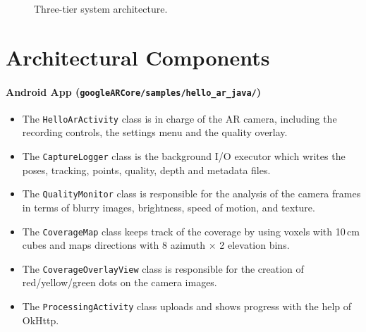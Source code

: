 \begin{figure}[htbp]
\caption{Three-tier system architecture.}
\label{fig:architecture}
\end{figure}

\section{Architectural Components}
\label{sec:components}

\paragraph{Android App (\texttt{googleARCore/samples/hello\_ar\_java/})}
\begin{itemize}
    \item The \texttt{HelloArActivity} class is in charge of the AR camera, including the recording controls, the settings menu and the quality overlay.
    \item The \texttt{CaptureLogger} class is the background I/O executor which writes the poses, tracking, points, quality, depth and metadata files.
    \item The \texttt{QualityMonitor} class is responsible for the analysis of the camera frames in terms of blurry images, brightness, speed of motion, and texture.
    \item The \texttt{CoverageMap} class keeps track of the coverage by using voxels with 10\,cm cubes and maps directions with 8 azimuth $\times$ 2 elevation bins.
    \item The \texttt{CoverageOverlayView} class is responsible for the creation of red/yellow/green dots on the camera images.
    \item The \texttt{ProcessingActivity} class uploads and shows progress with the help of OkHttp.
\end{itemize}

